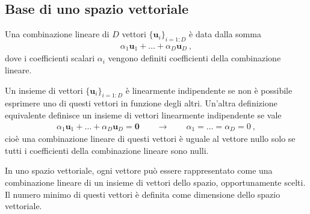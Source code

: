 \documentclass[letterpaper,10pt,english]{jupyterBook}
\begin{document}
\subsection{Base di uno spazio vettoriale}
\label{\detokenize{ch/algebra/vector-algebra-def:base-di-uno-spazio-vettoriale}}
\sphinxAtStartPar
{} Una combinazione lineare di \(D\) vettori \(\{ \mathbf{u}_i \}_{i=1:D}\) è data dalla somma
\begin{equation*}
\begin{split}\alpha_1 \mathbf{u}_1 + \dots + \alpha_D \mathbf{u}_D \ ,\end{split}
\end{equation*}
\sphinxAtStartPar
dove i coefficienti scalari \(\alpha_i\) vengono definiti coefficienti della combinazione lineare.

\sphinxAtStartPar
{} Un insieme di vettori \(\{ \mathbf{u}_i \}_{i=1:D}\) è linearmente indipendente se non è possibile esprimere uno di questi vettori in funzione degli altri. Un’altra definizione equivalente definisce un insieme di vettori linearmente indipendente se vale
\begin{equation*}
\begin{split}\alpha_1 \mathbf{u}_1 + \dots + \alpha_D \mathbf{u}_D = \mathbf{0} \qquad \rightarrow \qquad \alpha_1 = \dots = \alpha_D = 0 \ ,\end{split}
\end{equation*}
\sphinxAtStartPar
cioè una combinazione lineare di questi vettori è uguale al vettore nullo solo se tutti i coefficienti della combinazione lineare sono nulli.

\sphinxAtStartPar
{} In uno spazio vettoriale, ogni vettore può essere rappresentato come una combinazione lineare di un insieme di vettori dello spazio, opportunamente scelti. Il numero minimo di questi vettori è definita come dimensione dello spazio vettoriale.

\sphinxstepscope
\end{document}
